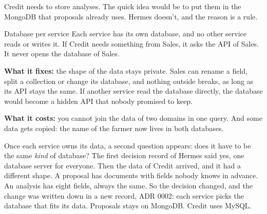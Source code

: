 Credit needs to store analyses. The quick idea would be to put them in the
MongoDB that proposals already uses. Hermes doesn't, and the reason is a rule.

\begin{concept}{Database per service}
Each service has its own database, and no other service reads or writes it.
If Credit needs something from Sales, it asks the API of Sales. It never
opens the database of Sales.

\textbf{What it fixes:} the shape of the data stays private. Sales can rename
a field, split a collection or change its database, and nothing outside
breaks, as long as its API stays the same. If another service read the
database directly, the database would become a hidden API that nobody
promised to keep.

\textbf{What it costs:} you cannot join the data of two domains in one query.
And some data gets copied: the name of the farmer now lives in both
databases.
\end{concept}

Once each service owns its data, a second question appears: does it have to
be the same \emph{kind} of database? The first decision record of Hermes said
yes, one database server for everyone. Then the data of Credit arrived, and
it had a different shape. A proposal has documents with fields nobody knows
in advance. An analysis has eight fields, always the same. So the decision
changed, and the change was written down in a new record, ADR 0002: each
service picks the database that fits its data. Proposals stays on MongoDB.
Credit uses MySQL.

\begin{center}
\end{center}


